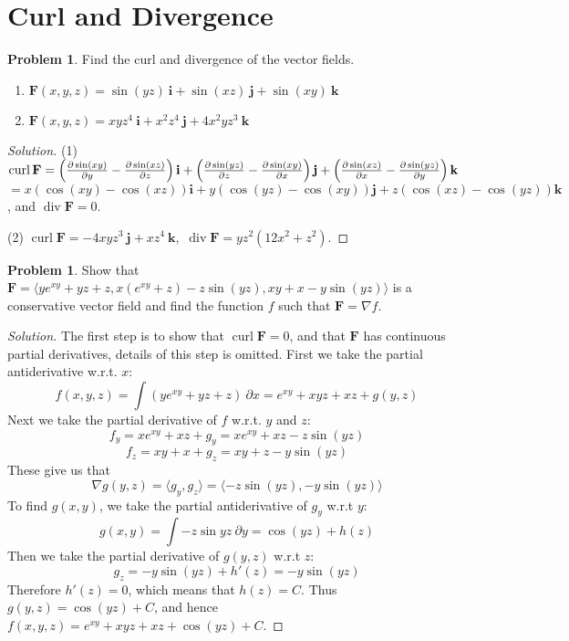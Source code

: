 \documentclass[12pt]{amsart}%
\theoremstyle{plain}
\theoremstyle{definition}
\newtheorem{prob}[theorem]{Problem}
\newcommand{\lp}[0]{\left(}
\newcommand{\rp}[0]{\right)}
\theoremstyle{special}
\newcommand{\sol}[1]{
{\begin{proof}[Solution]#1\end{proof}}
}
\newcommand{\Prob}[1]{\begin{tcolorbox}%
\begin{prob}
	#1
\end{prob}
\end{tcolorbox}	
}
\renewcommand{\vec}{\mathbf}
\DeclareMathOperator{\cur}{curl}
\DeclareMathOperator{\Div}{div}
\begin{document}
\section{Curl and Divergence}
\Prob{Find the curl and divergence of the vector fields.
\begin{enumerate}
	\item $\vec F(x,y,z)=\sin(yz)\ \vec i+\sin(xz)\ \vec j+\sin(xy)\ \vec k$
	\item $\vec F(x,y,z)=xyz^4\ \vec i+x^2z^4\ \vec j+4x^2yz^3\ \vec k$
\end{enumerate}
}{
\sol{(1) $\cur \vec F=
\lp {\partial \sin(xy)\over\partial y}-{\partial \sin(xz)\over \partial z}\rp\vec i+
\lp {\partial \sin(yz)\over\partial z}-{\partial \sin(xy)\over \partial x}\rp\vec j+
\lp {\partial \sin(xz)\over \partial x}-{\partial \sin(yz)\over\partial y}\rp\vec k$ $= x (\cos(x y) - \cos(x z)) \vec i+ y ( \cos(y z)-\cos(x y)) \vec j+ z (\cos(x z) - \cos(y z)) \vec k$, and $  \Div \vec F=0$.

(2) $\cur \vec F=-4xyz^3\ \vec j+xz^4\ \vec k$,\ $\Div\vec F=yz^2(12x^2+z^2)$.
}
}
\Prob{Show that $\vec F= \langle y   e^{x y} + y z + z, x (e^{x y} + z) - z \sin(y z), x y + x - y \sin(y z)\rangle $ is a conservative vector field and find the function $f$ such that $\vec F=\nabla f$.}
\sol{
The first step is to show that $\cur \vec F=0$, and that $\vec F$ has continuous partial derivatives, details of this step is omitted.
	First we take the partial antiderivative w.r.t. $x$:
	\[f(x,y,z)=\int (ye^{xy}+yz+z)\ \partial x=e^{xy}+xyz+xz+g(y,z)\]
	Next we take the partial derivative of $f$ w.r.t. $y$ and $z$:
	\[f_y= xe^{xy}+xz+g_y=xe^{xy}+xz-z\sin(yz)\]
	\[f_z= xy+x+g_z=xy+z-y\sin(yz)\]
	These give us that
	\[\nabla g(y,z)=\langle g_y, g_z\rangle=\langle-z\sin(yz),-y\sin(yz)\rangle\]
	To find $g(x,y)$, we take the partial antiderivative of $g_y$ w.r.t $y$:
	\[g(x,y)=\int -z\sin yz\ \partial y=\cos(yz)+h(z)\]
	Then we take the partial derivative of $g(y,z)$ w.r.t $z$:
	\[g_z=-y\sin(yz)+h'(z)=-y\sin(yz)\]
	Therefore $h'(z)=0$, which means that $h(z)=C$. Thus $g(y,z)=\cos(yz)+C$, and hence $f(x,y,z)=e^{xy}+xyz+xz+\cos(yz)+C$.
}

\newpage
\end{document}
